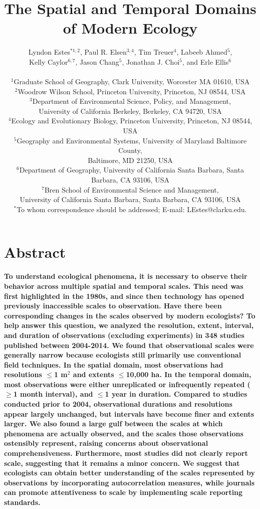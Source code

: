 \documentclass[12pt]{article}
\title{The Spatial and Temporal Domains of Modern Ecology }%
\author
{Lyndon Estes$^{\ast1, 2}$, Paul R. Elsen$^{3, 4}$, Tim Treuer$^{4}$, Labeeb Ahmed$^{5}$, \\
Kelly Caylor$^{6, 7}$, Jason Chang$^{5}$, Jonathan J. Choi$^{5}$, and Erle Ellis$^{6}$ \\
\\
\normalsize{$^{1}$Graduate School of Geography, Clark University, Worcester MA 01610, USA}\\
\normalsize{$^{2}$Woodrow Wilson School, Princeton University, Princeton, NJ 08544, USA}\\
\normalsize{$^{3}$Department of Environmental Science, Policy, and Management,}\\
\normalsize{University of California Berkeley, Berkeley, CA 94720, USA}\\
\normalsize{$^{4}$Ecology and Evolutionary Biology, Princeton University, Princeton, NJ 08544, USA}\\
\normalsize{$^{5}$Geography and Environmental Systems, University of Maryland Baltimore County,}\\ 
\normalsize{Baltimore, MD 21250, USA}\\
\normalsize{$^{6}$Department of Geography, University of California Santa Barbara, Santa Barbara, CA 93106, USA}\\
\normalsize{$^{7}$Bren School of Environmental Science and Management,}\\
\normalsize{University of California Santa Barbara, Santa Barbara, CA 93106, USA}\\
\normalsize{$^\ast$To whom correspondence should be addressed; E-mail:  LEstes@clarku.edu.}}
\date{}
\begin{document}
 


\baselineskip12pt


\maketitle 

\section*{Abstract}
\textbf{To understand ecological phenomena, it is necessary to observe their behavior across multiple spatial and temporal scales. This need was first highlighted in the 1980s, and since then technology has opened previously inaccessible scales to observation. Have there been corresponding changes in the scales observed by modern ecologists? To help answer this question, we analyzed the resolution, extent, interval, and duration of observations (excluding experiments) in 348 studies published between 2004-2014. We found that observational scales were generally narrow because ecologists still primarily use conventional field techniques. In the spatial domain, most observations had resolutions $\leq$1 m$^2$ and extents $\leq$10,000 ha. In the temporal domain, most observations were either unreplicated or infrequently repeated ($\geq$1 month interval), and $\leq$1 year in duration. Compared to studies conducted prior to 2004, observational durations and resolutions appear largely unchanged, but intervals have become finer and extents larger. We also found a large gulf between the scales at which phenomena are actually observed, and the scales those observations ostensibly represent, raising concerns about observational comprehensiveness. Furthermore, most studies did not clearly report scale, suggesting that it remains a minor concern. We suggest that ecologists can obtain better understanding of the scales represented by observations by incorporating autocorrelation measures, while journals can promote attentiveness to scale by implementing scale reporting standards.}
\end{document}
